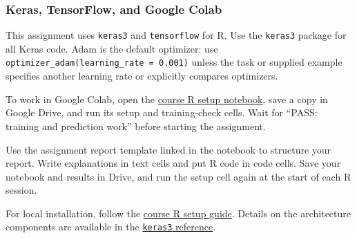\subsubsection*{Keras, TensorFlow, and Google Colab}

This assignment uses \texttt{keras3} and \texttt{tensorflow} for R. Use the \texttt{keras3} package for all Keras code. Adam is the default optimizer: use \texttt{optimizer\_adam(learning\_rate = 0.001)} unless the task or supplied example specifies another learning rate or explicitly compares optimizers.

To work in Google Colab, open the \href{https://colab.research.google.com/github/MansMeg/IntroML/blob/master/additional_material/colab_nb/setup_r_colab.ipynb}{course R setup notebook}, save a copy in Google Drive, and run its setup and training-check cells. Wait for ``PASS: training and prediction work'' before starting the assignment.

Use the assignment report template linked in the notebook to structure your report. Write explanations in text cells and put R code in code cells. Save your notebook and results in Drive, and run the setup cell again at the start of each R session.

For local installation, follow the \href{https://github.com/MansMeg/IntroML/tree/master/additional_material/r_setup}{course R setup guide}. Details on the architecture components are available in the \href{https://keras3.posit.co/}{\texttt{keras3} reference}.
